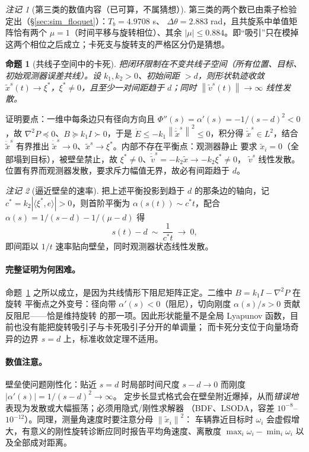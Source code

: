 \documentclass[11pt,a4paper]{ctexart}
\theoremstyle{plain}
\newtheorem{proposition}{命题}
\theoremstyle{definition}
\theoremstyle{remark}
\newtheorem{remark}{注记}
\newcommand{\txi}{\tilde{x}}
\newcommand{\ts}{\tilde{x}^{s}}
\newcommand{\tvs}{\tilde{v}^{s}}
\newcommand{\norm}[1]{\left\|#1\right\|}
\newcommand{\abs}[1]{\left|#1\right|}
\begin{document}
\begin{remark}[第三类的数值内容（已可算，不属猜想）]
第三类的两个数已由乘子检验定出（\S\ref{sec:sim_floquet}）：$T_b=4.9708$ s、
$\Delta\theta=2.883$ rad，且共旋系中单值矩阵恰有两个 $\mu=1$（时间平移与旋转相位）、其余
$|\mu|\le0.884$。即“吸引”只在模掉这两个相位之后成立；卡死支与旋转支的严格区分仍是猜想。
\end{remark}

\begin{proposition}[共线子空间中的卡死]
\label{prop:jam}
把闭环限制在不变共线子空间（所有位置、目标、初始观测器误差共线）。设 $k_1,k_2>0$、初始间距
$>d$，则形状轨迹收敛 $\ts(t)\to\xi^*$，$\xi^*\ne0$，且至少一对间距趋于 $d$；同时
$\norm{\tvs(t)}\to\infty$ 线性发散。
\end{proposition}
证明要点：一维中每条边只有径向方向且 $\Phi''(s)=\alpha'(s)=-1/(s-d)^2<0$，故
$\nabla^2P\preceq0$、$B\succeq k_1I\succ0$，于是 $\dot E\le-k_1\norm{\dot\ts}^2\le0$，积分得
$\dot\ts\in L^2$，结合 $\ddot\ts$ 有界推出 $\dot\ts\to0$、$\ts\to\xi^*$。内部不存在平衡点：观测器静止
要求 $\txi_i=0$（全部塌到目标），被壁垒禁止，故 $\xi^*\ne0$、$\dot\tvs=-k_2\txi\to-k_2\xi^*\ne0$，
$\tvs$ 线性发散。位置有界而观测器发散，要求斥力幅值无界，故必有间距趋于 $d$。

\begin{remark}[逼近壁垒的速率]
把上述平衡投影到趋于 $d$ 的那条边的轴向，记 $c^*=k_2\abs{\langle\xi^*,e\rangle}>0$，则首阶平衡为
$\alpha(s(t))\sim c^*t$，配合 $\alpha(s)=1/(s-d)-1/(\mu-d)$ 得
\begin{equation}
  s(t)-d\ \sim\ \frac{1}{c^*t}\ \longrightarrow\ 0 ,
  \label{eq:jamrate}
\end{equation}
即间距以 $1/t$ 速率贴向壁垒，同时观测器状态线性发散。
\end{remark}

\paragraph{完整证明为何困难。}
命题~\ref{prop:jam} 之所以成立，是因为共线情形下阻尼矩阵正定。二维中 $B=k_1I-\nabla^2P$ 在旋转
平衡点之外变号：径向带 $\alpha'(s)<0$（阻尼），切向刚度 $\alpha(s)/s>0$ 贡献反阻尼——恰是维持旋转
的那一项。因此形状能量不是全局 Lyapunov 函数，目前也没有能把旋转吸引子与卡死吸引子分开的单调量；
而卡死分支位于向量场奇异的边界 $s=d$ 上，标准收敛定理不适用。

\paragraph{数值注意。}
壁垒使问题刚性化：贴近 $s=d$ 时局部时间尺度 $s-d\to0$ 而刚度 $\abs{\alpha'(s)}=1/(s-d)^2\to\infty$。
定步长显式格式会在壁垒附近爆掉，从而\emph{错误地}表现为发散或大幅振荡；必须用隐式/刚性求解器
（BDF、LSODA，容差 $10^{-8}$–$10^{-12}$）。同理，测量角速度时要注意分母 $\norm{\txi_i}^2$：
车辆靠近目标时 $\omega_i$ 会虚假增大，有意义的刚性旋转诊断应同时报告平均角速度、离散度
$\max_i\omega_i-\min_i\omega_i$ 以及全部成对距离。
\end{document}
